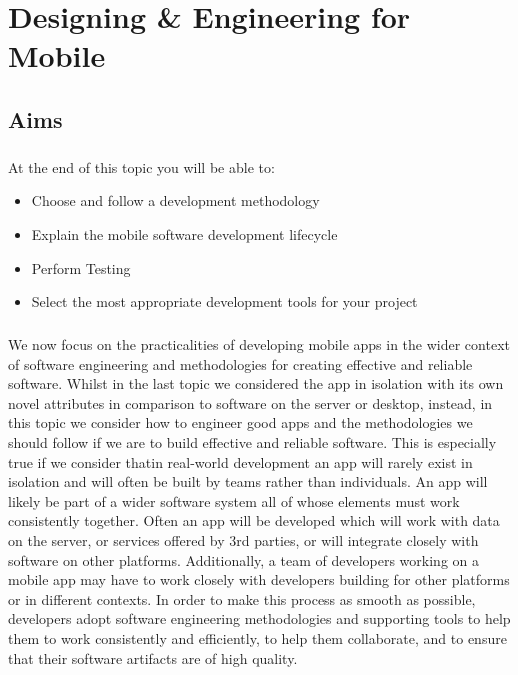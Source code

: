 \chapter{Designing \& Engineering for Mobile}

\section{Aims}
\paragraph{} At the end of this topic you will be able to:

\begin{itemize}
\item Choose and follow a development methodology
\item Explain the mobile software development lifecycle
\item Perform Testing
\item Select the most appropriate development tools for your project
\end{itemize}


\paragraph{} We now focus on the practicalities of developing mobile apps in the wider context of software engineering and methodologies for creating effective and reliable software. Whilst in the last topic we considered the app in isolation with its own novel attributes in comparison to software on the server or desktop, instead, in this topic we consider how to engineer good apps and the methodologies we should follow if we are to build effective and reliable software. This is especially true if we consider thatin real-world development an app will rarely exist in isolation and will often be built by teams rather than individuals. An app will likely be part of a wider software system all of whose elements must work consistently together. Often an app will be developed which will work with data on the server, or services offered by 3rd parties, or will integrate closely with software on other platforms. Additionally, a team of developers working on a mobile app may have to work closely with developers building for other platforms or in different contexts. In order to make this process as smooth as possible, developers adopt software engineering methodologies and supporting tools to help them to work consistently and efficiently, to help them collaborate, and to ensure that their software artifacts are of high quality.

